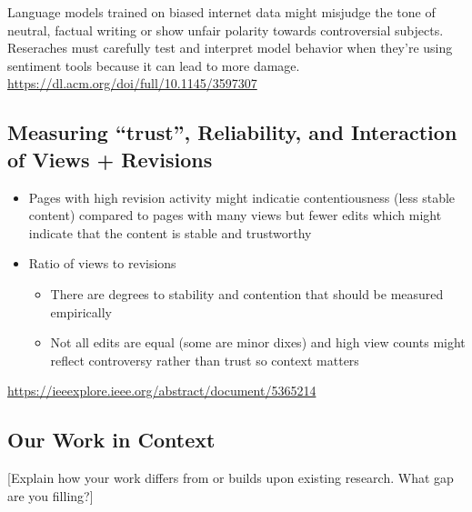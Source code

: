Language models trained on biased internet data might misjudge the tone of neutral, factual writing or show unfair polarity towards controversial subjects. 
Reseraches must carefully test and interpret model behavior when they’re using sentiment tools because it can lead to more damage. 
\url{https://dl.acm.org/doi/full/10.1145/3597307 }


\subsection{Measuring “trust”, Reliability, and Interaction of Views + Revisions}
\begin{itemize}
    \item Pages with high revision activity might indicatie contentiousness (less stable content) compared to pages with many views but fewer edits which might indicate that the content is stable and trustworthy
    \item Ratio of views to revisions
\begin{itemize}
    \item There are degrees to stability and contention that should be measured empirically 
    \item Not all edits are equal (some are minor dixes) and high view counts might reflect controversy rather than trust so context matters
\end{itemize}
\end{itemize}

\url{https://ieeexplore.ieee.org/abstract/document/5365214}

\subsection{Our Work in Context}

[Explain how your work differs from or builds upon existing research. What gap are you filling?]

